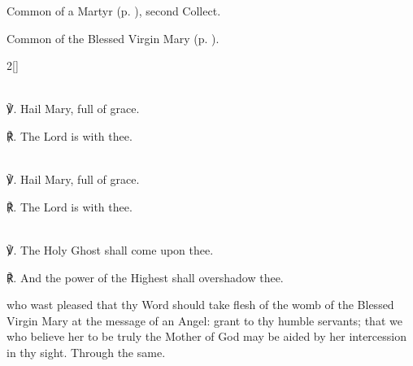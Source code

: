 \begin{rubric}
	Common of a Martyr (p. \pageref{CommonMartyrBishopCollect}), second Collect.
\end{rubric}



\begin{rubric}
	Common of the Blessed Virgin Mary (p. \pageref{CommonBVM}).
\end{rubric}


\vspace{-0.5\baselineskip}

\begin{paracol}{2}[]
\sloppy

\firstEvensong

\\

℣. Hail Mary, full of grace.

℟. The Lord is with thee.

\secondEvensong

\\

℣. Hail Mary, full of grace.

℟. The Lord is with thee.

\switchcolumn

\mattins

\\

℣. The Holy Ghost shall come upon thee.

℟. And the power of the Highest shall overshadow thee.


\fussy
\end{paracol}


\collect
{} who wast pleased that thy Word should take flesh of the womb of the Blessed Virgin Mary at the message of an Angel: grant to thy humble servants; that we who believe her to be truly the Mother of God may be aided by her intercession in thy sight. Through the same.


